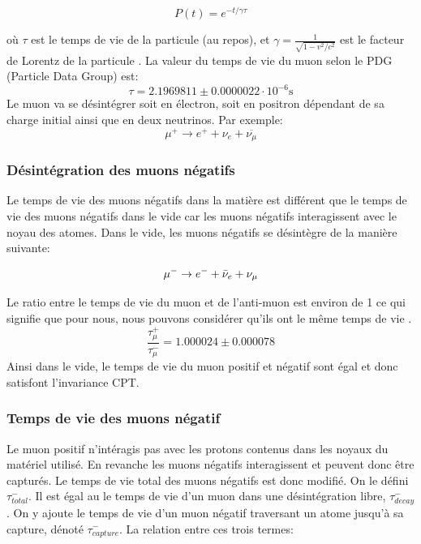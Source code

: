 \documentclass[12pt]{article}
\begin{document}
\begin{equation}
P(t) = e^{-t/\gamma\tau}
\end{equation}

où $\tau$  est le temps de vie de la particule (au repos), et $\gamma = \frac{1}{\sqrt{1-v^2/c^2}}$ est le facteur de Lorentz de la particule \cite{noauthor_particle_2019}. La valeur du temps de vie du muon selon le PDG (Particle Data Group)\cite{PhysRevD.98.030001} est: \[\tau = 2.1969811\pm0.0000022\cdot10^{-6} \text{s}\]
Le muon va se désintégrer soit en électron, soit en positron dépendant de sa charge initial ainsi que en deux neutrinos. Par exemple:
\begin{equation}
\mu^{+}\to e^{+}+\nu_{e}+\overline{\nu_{\mu}}
\end{equation}


\subsubsection{Désintégration des muons négatifs}

Le temps de vie des muons négatifs dans la matière est différent que le temps de vie des muons négatifs dans le vide car les muons négatifs interagissent avec le noyau des atomes. Dans le vide, les muons négatifs se désintègre de la manière suivante: 

\[ \mu^{-} \rightarrow e^{-} + \Bar{\nu}_{e} + \nu_{\mu} \]

Le ratio entre le temps de vie du muon et de l'anti-muon est environ de 1 ce qui signifie que pour nous, nous pouvons considérer qu'ils ont le même temps de vie \cite{haxton_symmetries_1995}.
\[\frac{\tau^{+}_{\mu}}{\tau^{-}_{\mu}}=1.000024\pm0.000078\]
Ainsi dans le vide, le temps de vie du muon positif et négatif sont égal et donc satisfont l'invariance CPT.


\subsubsection{Temps de vie des muons négatif}

Le muon positif n'intéragis pas avec les protons contenus dans les noyaux du matériel utilisé. En revanche les muons négatifs interagissent et peuvent donc être capturés. Le temps de vie total des muons négatifs est donc modifié. On le défini $\tau_{total}^{-}$. Il est égal au le temps de vie d'un muon dans une désintégration libre, $\tau_{decay}^{-}$. On y ajoute le temps de vie d'un  muon négatif traversant un atome jusqu'à sa capture, dénoté  $\tau_{capture}^{-}$. La relation entre ces trois termes: 
\end{document}
